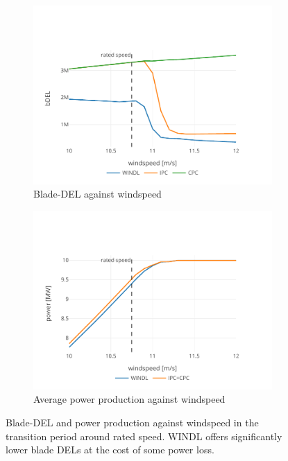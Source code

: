 \begin{figure}
  \centering
  \begin{subfigure}[b]{0.48\textwidth}
      \centering
      \includegraphics[width=\textwidth]{images/transition_bdel.pdf}
      \caption{Blade-\ac{DEL} against windspeed}
      \label{fig:transition-bdel}
  \end{subfigure}
  \begin{subfigure}[b]{0.48\textwidth}
      \centering
      \includegraphics[width=\textwidth]{images/transition_power.pdf}
      \caption{Average power production against windspeed}
      \label{fig:transition-power}
  \end{subfigure}
  \caption{Blade-DEL and power production against windspeed in the transition period around rated speed. WINDL offers significantly lower blade DELs at the cost of some power loss.}
  \label{fig:transition}
\end{figure}

